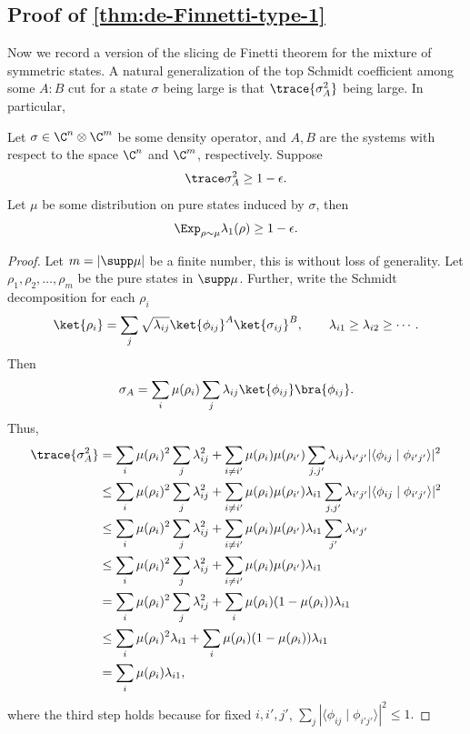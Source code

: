 \subsection{Proof of \cref{thm:de-Finnetti-type-1}}
Now we record a version of the slicing de Finetti theorem for the mixture of symmetric states. A natural generalization of the top Schmidt coefficient among some $A:B$ cut for a state $\sigma$ being large is that $\trace{\sigma_A^2} $ being large.
In particular,
\begin{lemma}\label{lem:trace-reduced-den-squared}
Let $\sigma\in\C^n\otimes\C^m$ be some density operator, and $A,B$ are the systems with respect to the space  $\C^n$ and $\C^m$, respectively. Suppose
\begin{equation*}
    \trace \sigma_A^2 \ge 1-\epsilon.
\end{equation*}
Let $\mu$ be some distribution on pure states induced by $\sigma$, then
\begin{align*}
    \Exp_{\rho\sim\mu} \lambda_1(\rho) \ge 1-\epsilon.
\end{align*}
\end{lemma}
\begin{proof}
Let $m=|\supp\mu|$ be a finite number, this is without loss of generality.  Let $\rho_1, \rho_2,\ldots, \rho_m$ be the pure states in $\supp\mu$. Further, write the Schmidt decomposition for each $\rho_i$
\begin{align*}
    \ket{\rho_i} = \sum_{j} \sqrt{\lambda_{ij}}\ket{\phi_{ij}}^{A}\ket{\sigma_{ij}}^{B},\qquad \lambda_{i1} \ge \lambda_{i2}\ge\cdots.
\end{align*}
Then
\begin{align*}
    \sigma_A = \sum_i \mu(\rho_i) \sum_j \lambda_{ij} \ket{\phi_{ij}}\bra{\phi_{ij}}.
\end{align*}
Thus,
\begin{align}
    \trace{\sigma_{A}^2} 
    &= \sum_i \mu(\rho_i)^2 \sum_j \lambda_{ij}^2 +    \sum_{i\not=i'}\mu(\rho_i)\mu(\rho_{i'})\sum_{j,j'}\lambda_{ij}\lambda_{i'j'}|\langle \phi_{ij} \mid \phi_{i'j'}\rangle|^2
    \nonumber\\
    &\le \sum_i \mu(\rho_i)^2 \sum_j \lambda_{ij}^2 + \sum_{i\not=i'}\mu(\rho_i)\mu(\rho_{i'})\lambda_{i1}\sum_{j,j'}\lambda_{i'j'}|\langle \phi_{ij} \mid \phi_{i'j'}\rangle|^2
    \nonumber\\
    &\le \sum_i \mu(\rho_i)^2 \sum_j \lambda_{ij}^2 + \sum_{i\not=i'}\mu(\rho_i)\mu(\rho_{i'})\lambda_{i1}\sum_{j'}\lambda_{i'j'}
    \nonumber\\
    &\le \sum_i \mu(\rho_i)^2  \sum_j \lambda_{ij}^2 + \sum_{i\not=i'}\mu(\rho_i)\mu(\rho_{i'}) \lambda_{i1}
    \nonumber\\
    &=\sum_i \mu(\rho_i)^2\sum_j \lambda_{ij}^2 + \sum_i \mu(\rho_i)(1-\mu(\rho_i))\lambda_{i1}
    \nonumber\\
    &\le \sum_i \mu(\rho_i)^2 \lambda_{i1} + \sum_i \mu(\rho_i)(1-\mu(\rho_i))\lambda_{i1}
    \nonumber\\
    &= \sum_i \mu(\rho_i)\lambda_{i1},
    \nonumber
\end{align}
where the third step holds because for fixed $i,i',j'$,  $\sum_{j} |\langle\phi_{ij}\mid \phi_{i'j'}\rangle|^2\le 1.$
\end{proof}


